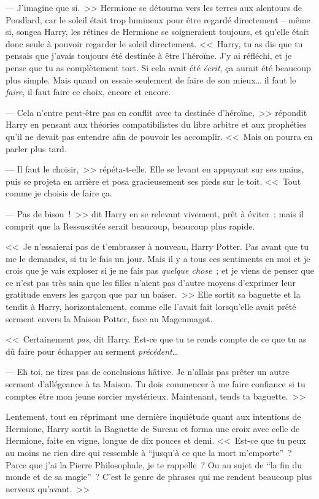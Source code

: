 --- J'imagine que si.~>> Hermione se détourna vers les terres aux alentours de Poudlard, car le soleil était trop lumineux pour être regardé directement -- même si, songea Harry, les rétines de Hermione se soigneraient toujours, et qu'elle était donc seule à pouvoir regarder le soleil directement. <<~Harry, tu as dis que tu pensais que j'avais toujours été destinée à être l'héroïne. J'y ai réfléchi, et je pense que tu as complètement tort. Si cela avait été \emph{écrit}, ça aurait été beaucoup plus simple. Mais quand on essaie seulement de faire de son mieux… il faut le \emph{faire}, il faut faire ce choix, encore et encore.

--- Cela n'entre peut-être pas en conflit avec ta destinée d'héroïne,~>> répondit Harry en pensant aux théories compatibilistes du libre arbitre et aux prophéties qu'il ne devait pas entendre afin de pouvoir les accomplir. <<~Mais on pourra en parler plus tard.

--- Il faut le choisir,~>> répéta-t-elle. Elle se levant en appuyant sur ses mains, puis se projeta en arrière et posa gracieusement ses pieds sur le toit. <<~Tout comme je choisis de faire ça.

--- Pas de bisou~!~>> dit Harry en se relevant vivement, prêt à éviter~; mais il comprit que la Ressuscitée serait beaucoup, beaucoup plus rapide.

<<~Je n'essaierai pas de t'embrasser à nouveau, Harry Potter. Pas avant que tu me le demandes, si tu le fais un jour. Mais il y a tous ces sentiments en moi et je crois que je vais exploser si je ne fais pas \emph{quelque chose}~; et je viens de penser que ce n'est pas très sain que les filles n'aient pas d'autre moyens d'exprimer leur gratitude envers les garçon que par un baiser.~>> Elle sortit sa baguette et la tendit à Harry, horizontalement, comme elle l'avait fait lorsqu'elle avait prêté serment envers la Maison Potter, face au Magenmagot.

<<~Certainement \emph{pas}, dit Harry. Est-ce que tu te rends compte de ce que tu as dû faire pour échapper au serment \emph{précédent}…

--- Eh toi, ne tires pas de conclusions hâtive. Je n'allais pas prêter un autre serment d'allégeance à ta Maison. Tu dois commencer à me faire confiance si tu comptes être mon jeune sorcier mystérieux. Maintenant, tends ta baguette.~>>

Lentement, tout en réprimant une dernière inquiétude quant aux intentions de Hermione, Harry sortit la Baguette de Sureau et forma une croix avec celle de Hermione, faite en vigne, longue de dix pouces et demi. <<~Est-ce que tu peux au moins ne rien dire qui ressemble à “jusqu'à ce que la mort m'emporte”~? Parce que j'ai la Pierre Philosophale, je te rappelle~? Ou au sujet de “la fin du monde et de sa magie”~? C'est le genre de phrases qui me rendent beaucoup plus nerveux qu'avant.~>>

